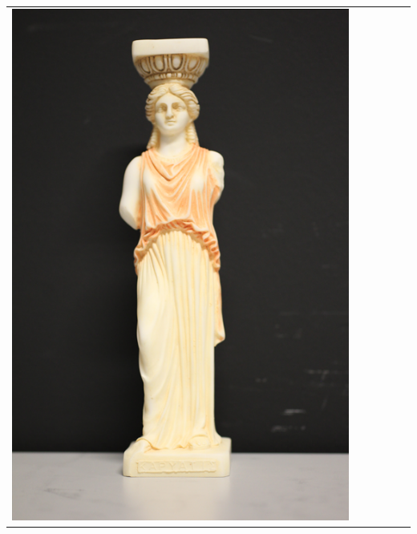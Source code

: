 \documentclass[final,12pt,3p]{elsarticle}
\begin{document}
\begin{table}
{\begin{tabular}{| c |  m{0.8cm} | m{0.8cm} | c | c | c |}
	\includegraphics[scale=0.05]{./images/kariatida_real.png} & 

\end{tabular}}
\end{table}
\end{document}
